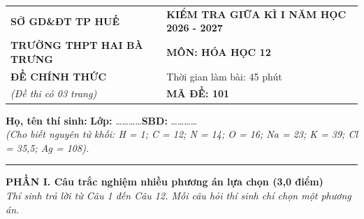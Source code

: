 \documentclass[11pt,a4paper]{article}
\begin{document}
\begin{table}[h!]
\centering
\begin{tabularx}{\textwidth}{@{}p{8.5cm}X@{}}
\textbf{SỞ GD\&ĐT TP HUẾ} & \textbf{KIỂM TRA GIỮA KÌ I NĂM HỌC 2026 - 2027} \\
\textbf{TRƯỜNG THPT HAI BÀ TRƯNG} & \textbf{MÔN: HÓA HỌC 12} \\
\textbf{ĐỀ CHÍNH THỨC} & Thời gian làm bài: 45 phút \\
\textit{(Đề thi có 03 trang)} & \textbf{MÃ ĐỀ: 101} \\
\end{tabularx}
\end{table}


\noindent\textbf{Họ, tên thí sinh:} \dotfill \textbf{Lớp:} \dots\dots\dots\dots \textbf{SBD:} \dots\dots\dots\dots\\
\textit{(Cho biết nguyên tử khối: H = 1; C = 12; N = 14; O = 16; Na = 23; K = 39; Cl = 35,5; Ag = 108).}
\par\vspace{-2pt}\noindent\textcolor{gray!40}{\rule{\textwidth}{0.5pt}}\par\vspace{2pt}


\noindent\textbf{\large\color{mainGreen}PHẦN I. Câu trắc nghiệm nhiều phương án lựa chọn (3,0 điểm)}\\
\textit{Thí sinh trả lời từ Câu 1 đến Câu 12. Mỗi câu hỏi thí sinh chỉ chọn một phương án.}
\vspace{4pt}
\end{document}

